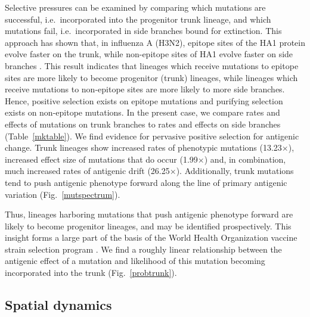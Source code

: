 \documentclass[11pt,oneside,letterpaper]{article}
\begin{document}
Selective pressures can be examined by comparing which mutations are successful, i.e.\ incorporated into the progenitor trunk lineage, and which mutations fail, i.e.\ incorporated in side branches bound for extinction.  This approach has shown that, in influenza A (H3N2), epitope sites of the HA1 protein evolve faster on the trunk, while non-epitope sites of HA1 evolve faster on side branches \cite{Bush99MBE,Wolf06,Bhatt11}.  This result indicates that lineages which receive mutations to epitope sites are more likely to become progenitor (trunk) lineages, while lineages which receive mutations to non-epitope sites are more likely to more side branches.  Hence, positive selection exists on epitope mutations and purifying selection exists on non-epitope mutations.  In the present case, we compare rates and effects of mutations on trunk branches to rates and effects on side branches (Table~\ref{mktable}).  We find evidence for pervasive positive selection for antigenic change.  Trunk lineages show increased rates of phenotypic mutations (13.23$\times$), increased effect size of mutations that do occur (1.99$\times$) and, in combination, much increased rates of antigenic drift (26.25$\times$).  Additionally, trunk mutations tend to push antigenic phenotype forward along the line of primary antigenic variation (Fig.~\ref{mutspectrum}).  

Thus, lineages harboring mutations that push antigenic phenotype forward are likely to become progenitor lineages, and may be identified prospectively.  This insight forms a large part of the basis of the World Health Organization vaccine strain selection program \cite{Barr10}.  We find a roughly linear relationship between the antigenic effect of a mutation and likelihood of this mutation becoming incorporated into the trunk (Fig.~\ref{probtrunk}).

\subsection*{Spatial dynamics}
\end{document}
